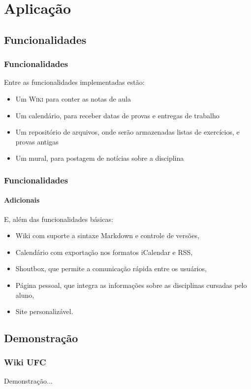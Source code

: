 \documentclass[11pt]{beamer}
\def\gap{\vspace{0.1in}}
\begin{document}
\section{Aplicação}

	\subsection{Funcionalidades}
	\begin{frame}
		\frametitle{Funcionalidades}

		Entre as funcionalidades implementadas estão:

		\gap
		\begin{itemize}
			\item Um \textsc{Wiki} para conter as notas de aula
			\item Um calendário, para receber datas de provas e entregas de
			trabalho
			\item Um repositório de arquivos, onde serão armazenadas listas de
			exercícios, e provas antigas
			\item Um mural, para postagem de notícias sobre a disciplina
		\end{itemize}
	\end{frame}

	\begin{frame}
		\frametitle{Funcionalidades}
		\framesubtitle{Adicionais}

		E, além das funcionalidades básicas:

		\gap
		\begin{itemize}
			\item Wiki com suporte a sintaxe Markdown e controle de versões,
			\item Calendário com exportação nos formatos iCalendar e RSS,
			\item Shoutbox, que permite a comunicação rápida entre os usuários,
			\item Página pessoal, que integra as informações sobre as disciplinas cursadas pelo
			aluno,
			\item Site personalizável.
		\end{itemize}
	\end{frame}

	\subsection{Demonstração}
	\begin{frame}
		\frametitle{Wiki UFC}
		\begin{center}\alert{Demonstração...}\end{center}
	\end{frame}
\end{document}
